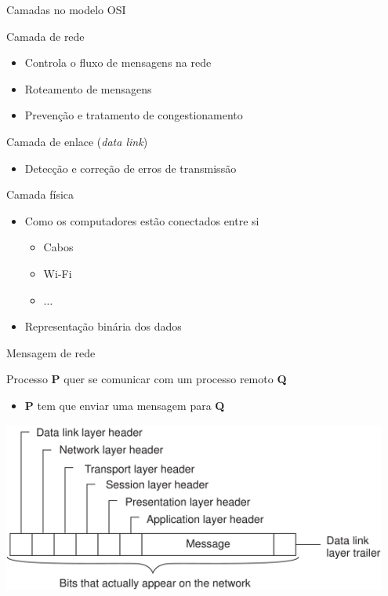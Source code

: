 \documentclass[compress]{beamer}
\begin{document}

\begin{frame}{Camadas no modelo OSI}

Camada de rede
\begin{itemize}
    \item Controla o fluxo de mensagens na rede
    \item Roteamento de mensagens
    \item Prevenção e tratamento de congestionamento 
\end{itemize}

\vspace{0.5cm}

Camada de enlace (\textit{data link})
\begin{itemize}
    \item Detecção e correção de erros de transmissão
\end{itemize}

\vspace{0.5cm}

Camada física
\begin{itemize}
    \item Como os computadores estão conectados entre si
    \begin{itemize}
        \item Cabos
        \item Wi-Fi
        \item $\ldots$
    \end{itemize}
    \item Representação binária dos dados
\end{itemize}

\end{frame}


\begin{frame}{Mensagem de rede}

Processo \textbf{P} quer se comunicar com um processo remoto \textbf{Q}
\begin{itemize}
    \item \textbf{P} tem que enviar uma mensagem para \textbf{Q}
\end{itemize}

\vspace{1cm}

\centering \includegraphics[width=0.95\textwidth]{images/osi_message.png}

\end{frame}
\end{document}
